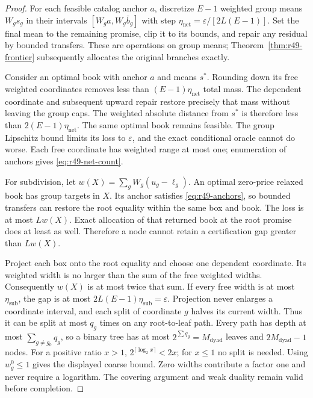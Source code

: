 \begin{proof}
For each feasible catalog anchor $a$, discretize $E-1$ weighted group means $W_gs_g$ in their intervals $[W_ga,W_g\bar b_g]$ with step $\eta_{\mathrm{net}}=\varepsilon/[2L(E-1)]$. Set the final mean to the remaining promise, clip it to its bounds, and repair any residual by bounded transfers. These are operations on group means; Theorem~\ref{thm:r49-frontier} subsequently allocates the original branches exactly.

Consider an optimal book with anchor $a$ and means $s^*$. Rounding down its free weighted coordinates removes less than $(E-1)\eta_{\mathrm{net}}$ total mass. The dependent coordinate and subsequent upward repair restore precisely that mass without leaving the group caps. The weighted absolute distance from $s^*$ is therefore less than $2(E-1)\eta_{\mathrm{net}}$. The same optimal book remains feasible. The group Lipschitz bound limits its loss to $\varepsilon$, and the exact conditional oracle cannot do worse. Each free coordinate has weighted range at most one; enumeration of anchors gives \eqref{eq:r49-net-count}.

For subdivision, let $w(X)=\sum_gW_g(u_g-\ell_g)$. An optimal zero-price relaxed book has group targets in $X$. Its anchor satisfies \eqref{eq:r49-anchors}, so bounded transfers can restore the root equality within the same box and book. The loss is at most $Lw(X)$. Exact allocation of that returned book at the root promise does at least as well. Therefore a node cannot retain a certification gap greater than $Lw(X)$.

Project each box onto the root equality and choose one dependent coordinate. Its weighted width is no larger than the sum of the free weighted widths. Consequently $w(X)$ is at most twice that sum. If every free width is at most $\eta_{\mathrm{sub}}$, the gap is at most $2L(E-1)\eta_{\mathrm{sub}}=\varepsilon$. Projection never enlarges a coordinate interval, and each split of coordinate $g$ halves its current width. Thus it can be split at most $q_g$ times on any root-to-leaf path. Every path has depth at most $\sum_{g\ne g_0}q_g$, so a binary tree has at most $2^{\sum q_g}=M_{\mathrm{dyad}}$ leaves and $2M_{\mathrm{dyad}}-1$ nodes. For a positive ratio $x>1$, $2^{\lceil\log_2x\rceil}<2x$; for $x\leq1$ no split is needed. Using $w_g^0\leq1$ gives the displayed coarse bound. Zero widths contribute a factor one and never require a logarithm. The covering argument and weak duality remain valid before completion.\end{proof}

